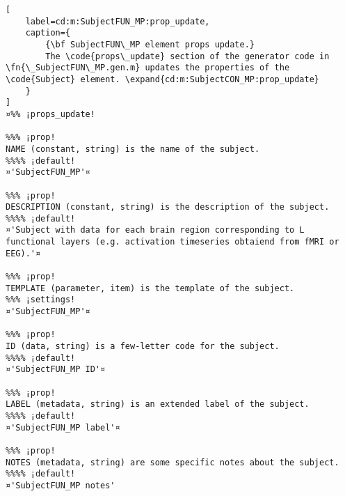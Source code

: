 \documentclass{tufte-handout}
\begin{document}
\begin{lstlisting}[
	label=cd:m:SubjectFUN_MP:prop_update,
	caption={
		{\bf SubjectFUN\_MP element props update.}
		The \code{props\_update} section of the generator code in \fn{\_SubjectFUN\_MP.gen.m} updates the properties of the \code{Subject} element. \expand{cd:m:SubjectCON_MP:prop_update}
	}
]
¤%% ¡props_update!

%%% ¡prop!
NAME (constant, string) is the name of the subject.
%%%% ¡default!
¤'SubjectFUN_MP'¤

%%% ¡prop!
DESCRIPTION (constant, string) is the description of the subject.
%%%% ¡default!
¤'Subject with data for each brain region corresponding to L functional layers (e.g. activation timeseries obtaiend from fMRI or EEG).'¤

%%% ¡prop!
TEMPLATE (parameter, item) is the template of the subject.
%%% ¡settings!
¤'SubjectFUN_MP'¤

%%% ¡prop!
ID (data, string) is a few-letter code for the subject.
%%%% ¡default!
¤'SubjectFUN_MP ID'¤

%%% ¡prop!
LABEL (metadata, string) is an extended label of the subject.
%%%% ¡default!
¤'SubjectFUN_MP label'¤

%%% ¡prop!
NOTES (metadata, string) are some specific notes about the subject.
%%%% ¡default!
¤'SubjectFUN_MP notes'
\end{lstlisting}
\end{document}
